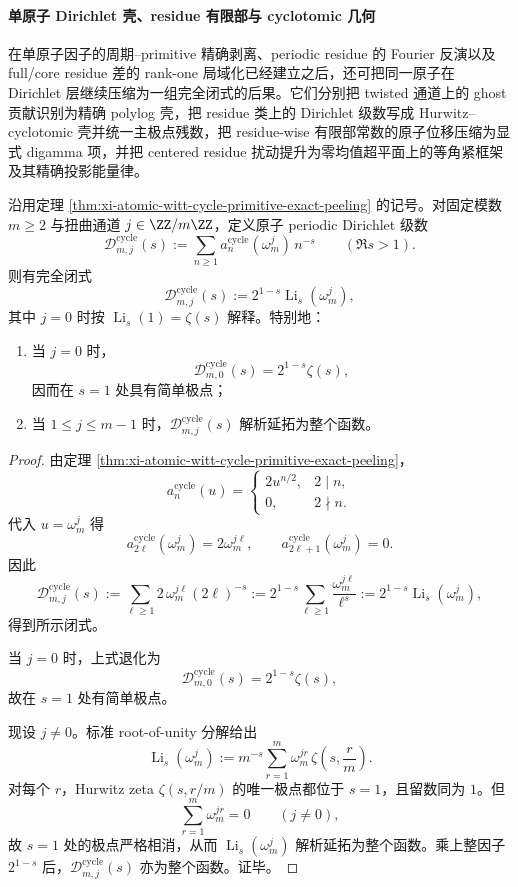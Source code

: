 \paragraph{单原子 Dirichlet 壳、residue 有限部与 cyclotomic 几何}
在单原子因子的周期--primitive 精确剥离、periodic residue 的 Fourier 反演以及 full/core residue 差的 rank-one 局域化已经建立之后，还可把同一原子在 Dirichlet 层继续压缩为一组完全闭式的后果。它们分别把 twisted 通道上的 ghost 贡献识别为精确 polylog 壳，把 residue 类上的 Dirichlet 级数写成 Hurwitz--cyclotomic 壳并统一主极点残数，把 residue-wise 有限部常数的原子位移压缩为显式 digamma 项，并把 centered residue 扰动提升为零均值超平面上的等角紧框架及其精确投影能量律。

\begin{theorem}\label{thm:xi-time-part77-atomic-twisted-dirichlet-polylog-shell}
沿用定理 \ref{thm:xi-atomic-witt-cycle-primitive-exact-peeling} 的记号。对固定模数 \(m\ge 2\) 与扭曲通道 \(j\in \ZZ/m\ZZ\)，定义原子 periodic Dirichlet 级数
\[
\mathcal D^{\mathrm{cycle}}_{m,j}(s)
:=
\sum_{n\ge 1}a_n^{\mathrm{cycle}}(\omega_m^j)\,n^{-s}
\qquad (\Re s>1).
\]
则有完全闭式
\[
\mathcal D^{\mathrm{cycle}}_{m,j}(s)
:=
2^{1-s}\operatorname{Li}_s(\omega_m^j),
\]
其中 \(j=0\) 时按 \(\operatorname{Li}_s(1)=\zeta(s)\) 解释。特别地：
\begin{enumerate}
  \item 当 \(j=0\) 时，
  \[
  \mathcal D^{\mathrm{cycle}}_{m,0}(s)=2^{1-s}\zeta(s),
  \]
  因而在 \(s=1\) 处具有简单极点；
  \item 当 \(1\le j\le m-1\) 时，\(\mathcal D^{\mathrm{cycle}}_{m,j}(s)\) 解析延拓为整个函数。
\end{enumerate}
\end{theorem}
\begin{proof}
由定理 \ref{thm:xi-atomic-witt-cycle-primitive-exact-peeling}，
\[
a_n^{\mathrm{cycle}}(u)=
\begin{cases}
2u^{n/2},& 2\mid n,\\
0,& 2\nmid n.
\end{cases}
\]
代入 \(u=\omega_m^j\) 得
\[
a_{2\ell}^{\mathrm{cycle}}(\omega_m^j)=2\omega_m^{j\ell},
\qquad
a_{2\ell+1}^{\mathrm{cycle}}(\omega_m^j)=0.
\]
因此
\[
\mathcal D^{\mathrm{cycle}}_{m,j}(s)
:=
\sum_{\ell\ge 1}2\,\omega_m^{j\ell}(2\ell)^{-s}
:=
2^{1-s}\sum_{\ell\ge 1}\frac{\omega_m^{j\ell}}{\ell^s}
:=
2^{1-s}\operatorname{Li}_s(\omega_m^j),
\]
得到所示闭式。

当 \(j=0\) 时，上式退化为
\[
\mathcal D^{\mathrm{cycle}}_{m,0}(s)=2^{1-s}\zeta(s),
\]
故在 \(s=1\) 处有简单极点。

现设 \(j\neq 0\)。标准 root-of-unity 分解给出
\[
\operatorname{Li}_s(\omega_m^j)
:=
m^{-s}\sum_{r=1}^{m}\omega_m^{jr}\,\zeta\!\left(s,\frac{r}{m}\right).
\]
对每个 \(r\)，Hurwitz zeta \(\zeta(s,r/m)\) 的唯一极点都位于 \(s=1\)，且留数同为 \(1\)。但
\[
\sum_{r=1}^{m}\omega_m^{jr}=0
\qquad (j\neq 0),
\]
故 \(s=1\) 处的极点严格相消，从而 \(\operatorname{Li}_s(\omega_m^j)\) 解析延拓为整个函数。乘上整因子 \(2^{1-s}\) 后，\(\mathcal D^{\mathrm{cycle}}_{m,j}(s)\) 亦为整个函数。证毕。
\end{proof}

